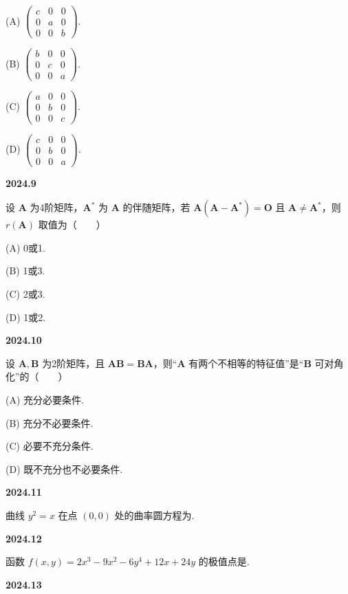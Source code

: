 \documentclass[UTF8,12pt,fontset=windows]{ctexart}
\begin{document}
(A) $\begin{pmatrix}c&0&0\\0&a&0\\0&0&b\end{pmatrix}$.

(B) $\begin{pmatrix}b&0&0\\0&c&0\\0&0&a\end{pmatrix}$.

(C) $\begin{pmatrix}a&0&0\\0&b&0\\0&0&c\end{pmatrix}$.

(D) $\begin{pmatrix}c&0&0\\0&b&0\\0&0&a\end{pmatrix}$.

\vfill
\newpage
{\large\bfseries 2024.9}

设 $\boldsymbol{A}$ 为4阶矩阵，$\boldsymbol{A}^*$ 为 $\boldsymbol{A}$ 的伴随矩阵，若 $\boldsymbol{A}(\boldsymbol{A}-\boldsymbol{A}^*)=\boldsymbol{O}$ 且 $\boldsymbol{A}\neq\boldsymbol{A}^*$，则 $r(\boldsymbol{A})$ 取值为（　　）

(A) 0或1.

(B) 1或3.

(C) 2或3.

(D) 1或2.

\vfill
\newpage
{\large\bfseries 2024.10}

设 $\boldsymbol{A},\boldsymbol{B}$ 为2阶矩阵，且 $\boldsymbol{AB}=\boldsymbol{BA}$，则“$\boldsymbol{A}$ 有两个不相等的特征值”是“$\boldsymbol{B}$ 可对角化”的（　　）

(A) 充分必要条件.

(B) 充分不必要条件.

(C) 必要不充分条件.

(D) 既不充分也不必要条件.

\vfill
\newpage
{\large\bfseries 2024.11}

曲线 $y^2=x$ 在点 $(0,0)$ 处的曲率圆方程为\underline{\hspace{20mm}}.

\vfill
\newpage
{\large\bfseries 2024.12}

函数 $f(x,y)=2x^3-9x^2-6y^4+12x+24y$ 的极值点是\underline{\hspace{20mm}}.

\vfill
\newpage
{\large\bfseries 2024.13}
\end{document}
